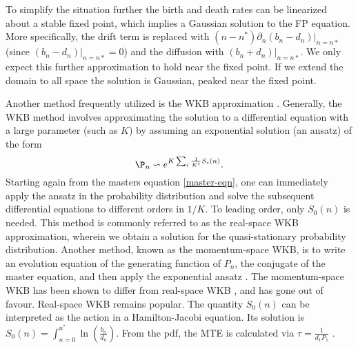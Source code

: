 To simplify the situation further the birth and death rates can be linearized about a stable fixed point, which implies a Gaussian solution to the FP equation. 
More specifically, the drift term is replaced with $(n-n^*)\partial_n(b_n - d_n)|_{n=n*}$ (since $(b_n - d_n)|_{n=n*}=0$) and the diffusion with $(b_n + d_n)|_{n=n*}$. 
We only expect this further approximation to hold near the fixed point. 
If we extend the domain to all space the solution is Gaussian, peaked near the fixed point. 

Another method frequently utilized is the WKB approximation \cite{}.
Generally, the WKB method involves approximating the solution to a differential equation with a large parameter (such as $K$) by assuming an exponential solution (an ansatz) of the form
\begin{equation}
\P_n \backsim e^{K\sum_i \frac{1}{K^i}S_i(n)}.
\label{WKBansatz}
\end{equation}
Starting again from the masters equation \ref{master-eqn}, one can immediately apply the ansatz in the probability distribution and solve the subsequent differential equations to different orders in $1/K$\cite{Assaf2016,etc}.%
To leading order, only $S_0(n)$ is needed. 
This method is commonly referred to as the real-space WKB approximation, wherein we obtain a solution for the quasi-stationary probability distribution.
Another method, known as the momentum-space WKB, is to write an evolution equation of the generating function of $P_n$, the conjugate of the master equation, and then apply the exponential ansatz \cite{Generating function stuff}.
The momentum-space WKB has been shown to differ from real-space WKB \cite{Ovaskainen?}, and has gone out of favour. 
Real-space WKB remains popular. 
The quantity $S_0(n)$ can be interpreted as the action in a Hamilton-Jacobi equation. 
Its solution is $S_0(n) = \int_{n=0}^{n^*} \ln\left(\frac{b_n}{d_n}\right)$. %
From the pdf, the MTE is calculated via $\tau = \frac{1}{d_1 P_1}$ \cite{Assaf?}. 

